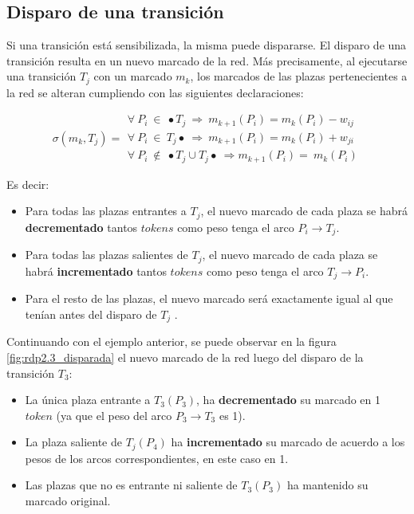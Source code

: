 \subsection{Disparo de una transición}
Si una transición está sensibilizada, la misma puede dispararse. El disparo de una transición resulta en un nuevo marcado de la red. Más precisamente, al ejecutarse una transición $T_j$ con un marcado $m_k$, los marcados de las plazas pertenecientes a la red se alteran cumpliendo con las siguientes declaraciones:

\begin{equation}
    \sigma (m_k, T_j) = 
    \begin{array}{cc}
         \forall \ P_i \ \in \ \bullet T_j \ \Rightarrow \ m_{k+1}(P_i) = m_k(P_i) - w_{ij}  \\
         \forall \ P_i \ \in \ T_j \bullet \ \Rightarrow \ m_{k+1}(P_i) = m_k(P_i) + w_{ji}  \\
         \forall \ P_i \ \notin \ \bullet T_j \cup T_j \bullet \ \Rightarrow m_{k+1}(P_i) = \ m_k(P_i)
    \end{array}
\end{equation}

\noindent Es decir:
\begin{itemize}
    \item Para todas las plazas entrantes a $T_j$, el nuevo marcado de cada plaza se habrá \textbf{decrementado} tantos $tokens$ como peso tenga el arco $P_i \rightarrow T_j$. 
    \item Para todas las plazas salientes de $T_j$, el nuevo marcado de cada plaza se habrá \textbf{incrementado} tantos $tokens$ como peso tenga el arco $T_j \rightarrow P_i$.
    \item Para el resto de las plazas, el nuevo marcado será exactamente igual al que tenían antes del disparo de $T_j$ .
\end{itemize}

Continuando con el ejemplo anterior, se puede observar en la figura \ref{fig:rdp2.3_disparada} el nuevo marcado de la red luego del disparo de la transición $T_3$:

\begin{itemize}
    \item La única plaza entrante a $T_3(P_3 )$, ha \textbf{decrementado} su marcado en 1 $token$ (ya que el peso del arco $P_3 \rightarrow T_3$ es 1).
    \item La plaza saliente de $T_j(P_4)$ ha \textbf{incrementado} su marcado de acuerdo a los pesos de los arcos correspondientes, en este caso en 1.
    \item Las plazas que no es entrante ni saliente de $T_3(P_3)$ ha mantenido su marcado original.
\end{itemize}

